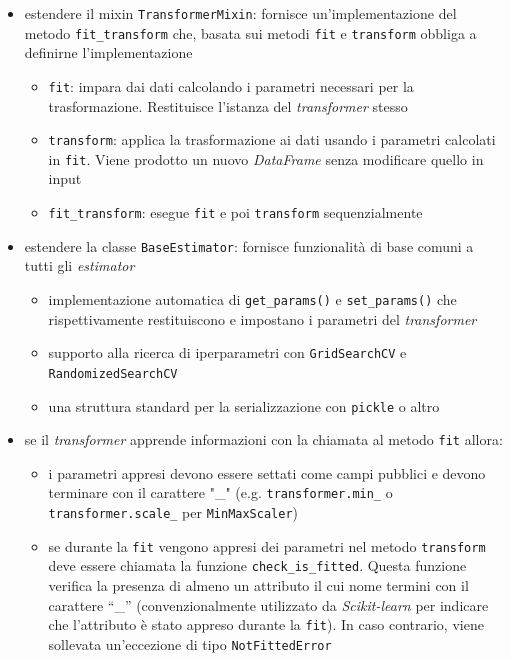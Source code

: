 \begin{itemize}
    \item estendere il mixin \texttt{TransformerMixin}: fornisce un'implementazione del metodo \texttt{fit\_transform} che, basata sui metodi \texttt{fit} e \texttt{transform} obbliga a definirne l'implementazione
    \begin{itemize}
        \item \texttt{fit}: impara dai dati calcolando i parametri necessari per la trasformazione. Restituisce l'istanza del \textit{transformer} stesso
        \item \texttt{transform}: applica la trasformazione ai dati usando i parametri calcolati in \texttt{fit}. Viene prodotto un nuovo \textit{DataFrame} senza modificare quello in input
        \item \texttt{fit\_transform}: esegue \texttt{fit} e poi \texttt{transform} sequenzialmente
    \end{itemize}
    \item estendere la classe \texttt{BaseEstimator}: fornisce funzionalità di base comuni a tutti gli \textit{estimator}
    \begin{itemize}
        \item implementazione automatica di \texttt{get\_params()} e \texttt{set\_params()} che rispettivamente restituiscono e impostano i parametri del \textit{transformer}
        \item supporto alla ricerca di iperparametri con \texttt{GridSearchCV} e \\ \texttt{RandomizedSearchCV}
        \item una struttura standard per la serializzazione con \texttt{pickle} o altro
    \end{itemize}
    \item se il \textit{transformer} apprende informazioni con la chiamata al metodo \texttt{fit} allora:
    \begin{itemize}
        \item i parametri appresi devono essere settati come campi pubblici e devono terminare con il carattere "\_" (e.g. \texttt{transformer.min\_} o \\ \texttt{transformer.scale\_} per \texttt{MinMaxScaler})
        \item se durante la \texttt{fit} vengono appresi dei parametri nel metodo \texttt{transform} deve essere chiamata la funzione \texttt{check\_is\_fitted}. Questa funzione verifica la presenza di almeno un attributo il cui nome termini con il carattere ``\_'' (convenzionalmente utilizzato da \textit{Scikit-learn} per indicare che l'attributo è stato appreso durante la \texttt{fit}). In caso contrario, viene sollevata un'eccezione di tipo \texttt{NotFittedError}
    \end{itemize} 
\end{itemize}

